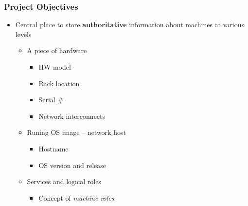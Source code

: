 \documentclass{beamer}
\begin{document}
\begin{frame}
\frametitle{Project Objectives}

\begin{itemize}
    \item Central place to store {\bf authoritative} information about machines
        at various levels
        \begin{itemize}
            \item A piece of hardware
                \begin{itemize}
                    \item HW model
                    \item Rack location
                    \item Serial \#
                    \item Network interconnects
                \end{itemize}
            \item Runing OS image -- network host
                \begin{itemize}
                    \item Hostname
                    \item OS version and release
                \end{itemize}
            \item Services and logical roles
                \begin{itemize}
                    \item Concept of {\em machine roles}
                \end{itemize}
        \end{itemize}

\end{itemize}
\end{frame}
\end{document}
